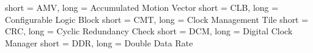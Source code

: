 
 { short =  AMV, long = Accumulated Motion Vector }
 { short =  CLB, long = Configurable Logic Block }
 { short =  CMT, long = Clock Management Tile }
 { short =  CRC, long = Cyclic Redundancy Check}
 { short =  DCM, long = Digital Clock Manager}
 { short =  DDR, long = Double Data Rate }
